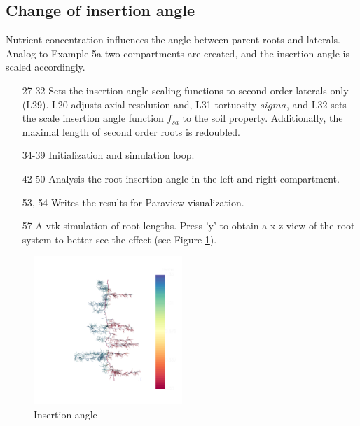 \subsection{Change of insertion angle} \label{sec:insertion_angle}

Nutrient concentration influences the angle between parent roots and laterals. %
Analog to Example 5a two compartments are created, and the insertion angle is scaled accordingly.



\begin{itemize}

\item[27-32] Sets the insertion angle scaling functions to second order laterals only (L29). L20 adjusts axial resolution and, L31 tortuosity $sigma$, and L32 sets the scale insertion angle function $f_{sa}$ to the soil property. Additionally, the maximal length of second order roots is redoubled. 

\item[34-39] Initialization and simulation loop.

\item[42-50] Analysis the root insertion angle in the left and right compartment. 

\item[53, 54] Writes the results for Paraview visualization.

\item[57] A vtk simulation of root lengths. Press 'y' to obtain a x-z view of the root system to better see the effect (see Figure \ref{fig:insertion}). 

\end{itemize}

\begin{figure}
\centering
\includegraphics[width=0.5\textwidth]{example5c.png}
\caption{Insertion angle} \label{fig:insertion}
\end{figure}


